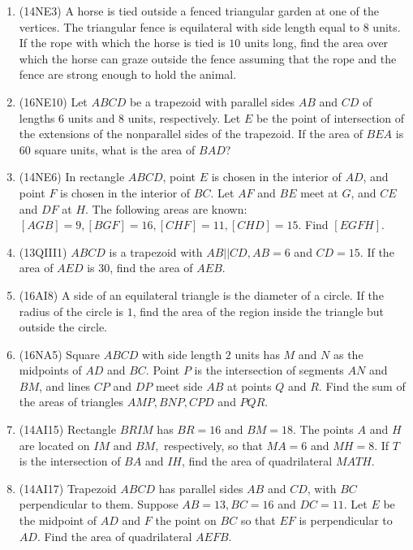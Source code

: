 \documentclass[10pt,paper=letter]{scrartcl}
\begin{document}
\begin{enumerate}

\item (14NE3) A horse is tied outside a fenced triangular garden at one of the vertices. The triangular fence is equilateral with side length equal to $8$ units. If the rope with which the horse is tied is $10$ units long, find the area over which the horse can graze outside the fence assuming that the rope and the fence are strong enough to hold the animal.

\item (16NE10) Let $ABCD$ be a trapezoid with parallel sides $AB$ and $CD$ of lengths $6$ units and $8$ units, respectively. Let $E$ be the point of intersection of the extensions of the nonparallel sides of the trapezoid. If the area of $BEA$ is $60$ square units, what is the area of $BAD$?

\item (14NE6) In rectangle $ABCD$, point $E$ is chosen in the interior of $AD$, and point $F$ is chosen in the interior of $BC$. Let $AF$ and $BE$ meet at $G$, and $CE$ and $DF$ at $H$. The following areas are known: $[AGB] = 9, [BGF] = 16, [CHF] = 11, [CHD] = 15$. Find $[EGFH]$.

\item (13QIII1) $ABCD$ is a trapezoid with $AB||CD, AB = 6$ and $CD = 15$. If the area of $AED$ is $30$, find the area of $AEB$.

\item (16AI8) A side of an equilateral triangle is the diameter of a circle. If the radius of the circle is $1$, find the area of the region inside the triangle but outside the circle.

\item (16NA5) Square $ABCD$ with side length $2$ units has $M$ and $N$ as the midpoints of $AD$ and $BC$. Point $P$ is the intersection of segments $AN$ and $BM$, and lines $CP$ and $DP$ meet side $AB$ at points $Q$ and $R$. Find the sum of the areas of triangles $AMP, BNP, CPD$ and $PQR$.

\item (14AI15) Rectangle $BRIM$ has $BR = 16$ and $BM = 18$. The points $A$ and $H$ are located on $IM$ and $BM,$ respectively, so that $MA = 6$ and $MH = 8$. If $T$ is the intersection of $BA$ and $IH$, find the area of quadrilateral $MATH$.

\item (14AI17) Trapezoid $ABCD$ has parallel sides $AB$ and $CD$, with $BC$ perpendicular to them. Suppose $AB = 13, BC = 16$ and $DC = 11$. Let $E$ be the midpoint of $AD$ and $F$ the point on $BC$ so that $EF$ is perpendicular to $AD$. Find the area of quadrilateral $AEFB$.


\end{enumerate}
\end{document}

